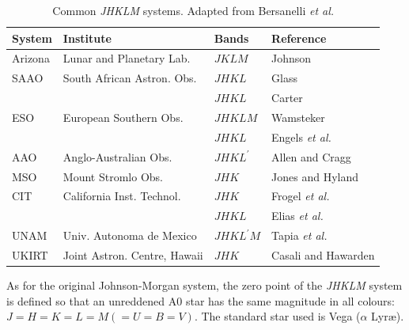 \documentclass[twoside,11pt]{article}
\begin{document}
\begin{description}
\begin{table}[htbp]
  \begin{center}
  \begin{tabular}{llll}
   System  & Institute                    & Bands   & Reference \\ \hline
   Arizona & Lunar and Planetary Lab.     & $JKLM$  & Johnson\cite{JOHNSON64} \\
   SAAO    & South African Astron. Obs.   & $JHKL$  & Glass\cite{GLASS74} \\
           &                              & $JHKL$  & Carter\cite{CARTER84, CARTER90} \\
   ESO     & European Southern Obs.       & $JHKLM$ & Wamsteker\cite{WAMSTEKER81} \\
           &                              & $JHKL$  & Engels {\it et al.}\/\cite{ENGELS81} \\
   AAO     & Anglo-Australian Obs.        & $JHKL^{\prime}$ & Allen and Cragg\cite{ALLEN83} \\
   MSO     & Mount Stromlo Obs.           & $JHK$   & Jones and Hyland\cite{JONES82} \\
   CIT     & California Inst. Technol.    & $JHK$   & Frogel {\it et al.}\/\cite{FROGEL78} \\
           &                              & $JHKL$  & Elias {\it et al.}\/\cite{ELIAS82, ELIAS83} \\
   UNAM    & Univ. Autonoma de Mexico     & $JHKL^{\prime} M$ & Tapia {\it et al.}\/\cite{TAPIA86} \\
   UKIRT   & Joint Astron. Centre, Hawaii & $JHK$   & Casali and Hawarden\cite{CASALI92} \\
  \end{tabular}
  \end{center}

  \begin{quote}
  \caption[Common {\it JHKLM} systems]{Common 
   {\it JHKLM} systems.  Adapted from Bersanelli {\it
   et al.}\/\cite{BERSANELLI91}
  \label{IRSYS} }
  \end{quote}

  \end{table}

   As for the original Johnson-Morgan system, the zero point of the
   {\it JHKLM} system is defined so that an unreddened A0 star has the
   same magnitude in all colours: $J = H = K = L = M (= U = B = V)$.
   The standard star used is Vega ($\alpha$ Lyr\ae ).

\end{description}
\end{document}
